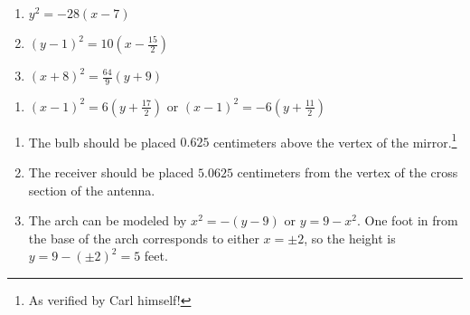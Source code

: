 \begin{multicols}{3}
\begin{enumerate}
\setcounter{enumi}{\value{HW}}

\item $y^{2} = -28(x - 7)$
\item $(y - 1)^{2} = 10\left(x - \frac{15}{2} \right)$
\item $(x + 8)^{2} = \frac{64}{9}(y + 9)$

\setcounter{HW}{\value{enumi}}
\end{enumerate}
\end{multicols}

\begin{enumerate}
\setcounter{enumi}{\value{HW}}


\item $(x - 1)^{2} = 6\left(y + \frac{17}{2}\right)$ or $(x - 1)^{2} = -6\left(y + \frac{11}{2}\right)$

\setcounter{HW}{\value{enumi}}
\end{enumerate}





\begin{enumerate}
\setcounter{enumi}{\value{HW}}

\item  The bulb should be placed $0.625$ centimeters above the vertex of the mirror.\footnote{As verified by Carl himself!}

\item  The receiver should be placed $5.0625$ centimeters from the vertex of the cross section of the antenna.

\item  The arch can be modeled by $x^2=-(y-9)$ or $y=9-x^2$.  One foot in from the base of the arch corresponds to either $x = \pm 2$, so the height is $y=9-(\pm 2)^2=5$ feet.

\end{enumerate}